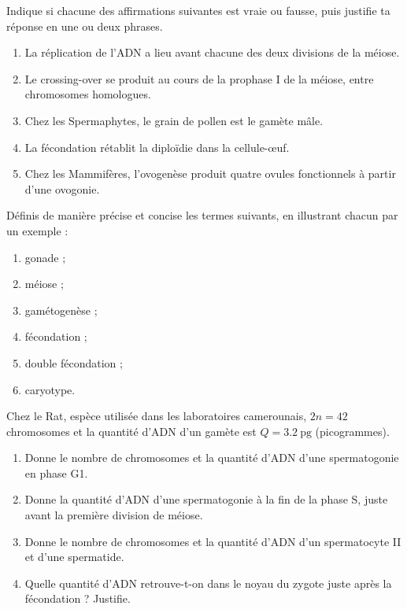 \documentclass[11pt]{article}
\begin{document}
\begin{exercice}
Indique si chacune des affirmations suivantes est vraie ou fausse, puis justifie ta réponse en une ou deux phrases.
\begin{enumerate}
\item La réplication de l'ADN a lieu avant chacune des deux divisions de la méiose.
\item Le crossing-over se produit au cours de la prophase I de la méiose, entre chromosomes homologues.
\item Chez les Spermaphytes, le grain de pollen est le gamète mâle.
\item La fécondation rétablit la diploïdie dans la cellule-\oe uf.
\item Chez les Mammifères, l'ovogenèse produit quatre ovules fonctionnels à partir d'une ovogonie.
\end{enumerate}
\end{exercice}

\begin{exercice}[Définitions]
Définis de manière précise et concise les termes suivants, en illustrant chacun par un exemple :
\begin{enumerate}
\item gonade ; \item méiose ; \item gamétogenèse ; \item fécondation ; \item double fécondation ; \item caryotype.
\end{enumerate}
\end{exercice}

\begin{exercice}
Chez le Rat, espèce utilisée dans les laboratoires camerounais, $2n = 42$ chromosomes et la quantité d'ADN d'un gamète est $Q = \SI{3,2}{\pico\gram}$ (picogrammes).
\begin{enumerate}
\item Donne le nombre de chromosomes et la quantité d'ADN d'une spermatogonie en phase G1.
\item Donne la quantité d'ADN d'une spermatogonie à la fin de la phase S, juste avant la première division de méiose.
\item Donne le nombre de chromosomes et la quantité d'ADN d'un spermatocyte II et d'une spermatide.
\item Quelle quantité d'ADN retrouve-t-on dans le noyau du zygote juste après la fécondation ? Justifie.
\end{enumerate}
\end{exercice}
\end{document}
